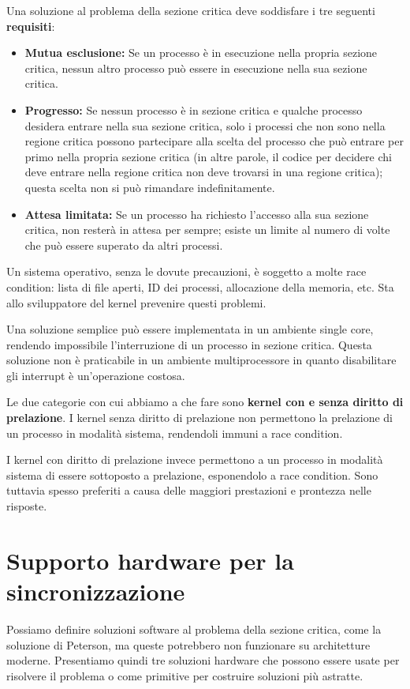     Una soluzione al problema della sezione critica deve soddisfare i tre seguenti \textbf{requisiti}:
    \begin{itemize}
        \item \textbf{Mutua esclusione:} Se un processo è in esecuzione nella propria sezione critica, nessun altro processo può essere in esecuzione nella sua sezione critica.
        
        \item \textbf{Progresso:} Se nessun processo è in sezione critica e qualche processo desidera entrare nella sua sezione critica, solo i processi che non sono nella regione critica possono partecipare alla scelta del processo che può entrare per primo nella propria sezione critica (in altre parole, il codice per decidere chi deve entrare nella regione critica non deve trovarsi in una regione critica); questa scelta non si può rimandare indefinitamente.
        
        \item \textbf{Attesa limitata:} Se un processo ha richiesto l'accesso alla sua sezione critica, non resterà in attesa per sempre; esiste un limite al numero di volte che può essere superato da altri processi.
    \end{itemize}
    
    Un sistema operativo, senza le dovute precauzioni, è soggetto a molte race condition: lista di file aperti, ID dei processi, allocazione della memoria, etc. Sta allo sviluppatore del kernel prevenire questi problemi.
    
    Una soluzione semplice può essere implementata in un ambiente single core, rendendo impossibile l'interruzione di un processo in sezione critica. Questa soluzione non è praticabile in un ambiente multiprocessore in quanto disabilitare gli interrupt è un'operazione costosa.
    
    Le due categorie con cui abbiamo a che fare sono \textbf{kernel con e senza diritto di prelazione}. I kernel senza diritto di prelazione non permettono la prelazione di un processo in modalità sistema, rendendoli immuni a race condition.
    
    I kernel con diritto di prelazione invece permettono a un processo in modalità sistema di essere sottoposto a prelazione, esponendolo a race condition. Sono tuttavia spesso preferiti a causa delle maggiori prestazioni e prontezza nelle risposte.
    
\section{Supporto hardware per la sincronizzazione}
    Possiamo definire soluzioni software al problema della sezione critica, come la soluzione di Peterson, ma queste potrebbero non funzionare su architetture moderne. Presentiamo quindi tre soluzioni hardware che possono essere usate per risolvere il problema o come primitive per costruire soluzioni più astratte.
    
